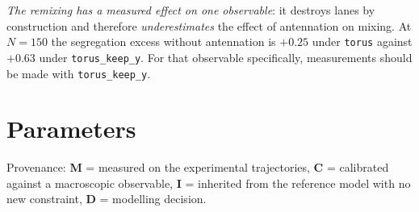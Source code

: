 \documentclass[11pt,a4paper]{article}
\newcommand{\code}[1]{\texttt{#1}}
\begin{document}
\emph{The remixing has a measured effect on one observable}: it destroys lanes
by construction and therefore \emph{underestimates} the effect of antennation
on mixing. At $N=150$ the segregation excess without antennation is $+0.25$
under \code{torus} against $+0.63$ under \code{torus\_keep\_y}. For that
observable specifically, measurements should be made with
\code{torus\_keep\_y}.

\section{Parameters}\label{sec:params}

Provenance: \textbf{M} = measured on the experimental trajectories,
\textbf{C} = calibrated against a macroscopic observable, \textbf{I} = inherited
from the reference model with no new constraint, \textbf{D} = modelling
decision.
\end{document}
